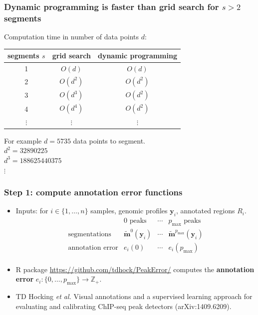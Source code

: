 \documentclass{beamer}
\newcommand{\ZZ}{\mathbb Z}
\begin{document}
\begin{frame}
  \frametitle{Dynamic programming is faster than grid search for $s>
    2$ segments}

  Computation time in number of data points $d$:

  \vskip 1cm

  \begin{tabular}{ccc}
    segments $s$ & grid search & dynamic programming \\
    \hline
    1 & $O(d)$ & $O(d)$ \\
    2 & $O(d^2)$ & $O(d^2)$ \\
    3 & $O(d^3)$ & $O(d^2)$ \\
    4 & $O(d^4)$ & $O(d^2)$ \\
    $\vdots$ &     $\vdots$ &     $\vdots$ 
  \end{tabular}

  \vskip 1cm

  For example $d = 5735$ data points to segment.\\
  $d^2 = 32890225$\\
  $d^3 = 188625440375$\\
  $\vdots$
\end{frame}



\begin{frame}
  \frametitle{Step 1: compute annotation error functions}
  \begin{itemize}
  \item Inputs: for $i\in\{1, \dots, n\}$ samples, genomic profiles
    $\mathbf y_i$, annotated regions $R_i$.
    \begin{equation*}
      \begin{array}{cccc}
        & \text{0 peaks} & \cdots & \text{$p_{\text{max}}$ peaks}\\
        \hline
        \text{segmentations} &
        \mathbf{\tilde m}^0(\mathbf y_i) & 
        \cdots & 
        \mathbf{\tilde m}^{p_{\text{max}}}(\mathbf y_i)\\
        \text{annotation error} & 
        e_i(0) &
        \cdots & 
        e_i(p_{\text{max}})\\
      \end{array}
    \end{equation*}
  \item R package \url{https://github.com/tdhock/PeakError/} computes
    the \textbf{annotation error}
    $e_i:\{0,\dots,p_{\text{max}}\}\rightarrow \ZZ_+$.
  \item   TD Hocking \emph{et al.} Visual annotations and a supervised
    learning approach for evaluating and calibrating ChIP-seq peak detectors
    (arXiv:1409.6209).
  \end{itemize}
\end{frame}
\end{document}
